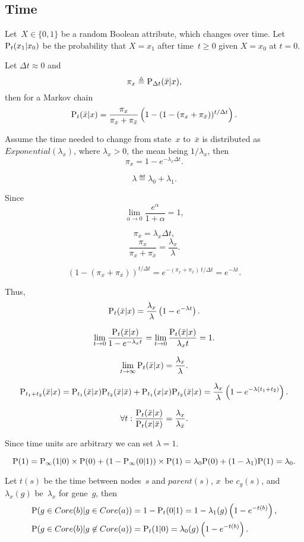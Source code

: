 \documentclass[10pt,a4paper]{article}
\theoremstyle{plain} \newtheorem{Lem}{Lemma}
\begin{document}
\subsection {Time}

Let~$X \in \{0,1\}$ be a random Boolean attribute, which changes over time.
Let $\P_t(x_1|x_0)$ be the probability that $X = x_1$ after time~$t \ge 0$ given $X = x_0$ at $t=0$.

Let $\Delta t \approx 0$ and
$$ \pi_x \eqdef \P_{\Delta t}(\bar x|x), $$
then for a Markov chain
$$ \P_t(\bar x|x) = \frac {\pi_x} {\pi_x + \pi_{\bar x}} \left(1 - (1 - (\pi_x + \pi_{\bar x}))^{t / \Delta t} \right). $$

Assume the time needed to change from state~$x$ to~$\bar x$ is distributed as $Exponential(\lambda_x)$, where $\lambda_x > 0$,
the mean being $1 / \lambda_x$,
then
$$ \pi_x = 1 - e^{- \lambda_x \Delta t}. $$

$$ \lambda \eqdef \lambda_0 + \lambda_1. $$

Since
$$ \lim_{\alpha \to 0} \frac {e^\alpha} {1 + \alpha} = 1, $$

$$ \pi_x = \lambda_x \Delta t, $$
$$ \frac {\pi_x} {\pi_x + \pi_{\bar x}} = \frac {\lambda_x} \lambda. $$

$$ (1 - (\pi_x + \pi_{\bar x}))^{t / \Delta t} = e^{-(\pi_x + \pi_{\bar x}) \ t / \Delta t}= e^{-\lambda t}.$$

Thus,
$$ \P_t(\bar x|x) = \frac {\lambda_x} \lambda \left(1 -  e^{-\lambda t} \right). $$

$$ \lim_{t \to 0} \frac {\P_t(\bar x|x)} {1 - e^{- \lambda_x t}} = \lim_{t \to 0} \frac {\P_t(\bar x|x)} {\lambda_x t} = 1. $$

$$ \lim_{t \to \infty} \P_t(\bar x|x) = \frac {\lambda_x} \lambda. $$

$$ \P_{t_1 + t_2}(\bar x|x) = \P_{t_1}(\bar x|x) \P_{t_2}(\bar x|\bar x) + \P_{t_1}(x|x) \P_{t_2}(\bar x|x)
  = \frac {\lambda_x} \lambda \left(1 -  e^{-\lambda (t_1 + t_2)} \right).
$$

$$ \forall t: \frac {\P_t(\bar x|x)} {\P_t(x|\bar x)} = \frac {\lambda_x} {\lambda_{\bar x}}. $$

Since time units are arbitrary we can set $\lambda = 1$.

$$ \P(1) = \P_\infty(1|0) \times \P(0) + (1 - \P_\infty(0|1)) \times \P(1) = \lambda_0 \P(0) + (1 - \lambda_1) \P(1) = \lambda_0. $$

Let $t(s)$ be the time between nodes~$s$ and $parent(s)$,
$x$~be $c_g(s)$,
and $\lambda_x(g)$ be~$\lambda_x$ for gene~$g$,
then
\begin{equation*}
\begin{split}
\P (g \in Core(b) | g \in Core(a)) &= 1 - \P_t(0|1) = 1 - \lambda_1(g) \left(1-e^{-t(b)} \right), \\
\P (g \in Core(b) | g \not \in Core(a)) &= \P_t(1|0)     = \lambda_0(g) \left(1-e^{-t(b)} \right).
\end{split}
\end{equation*}
\end{document}
